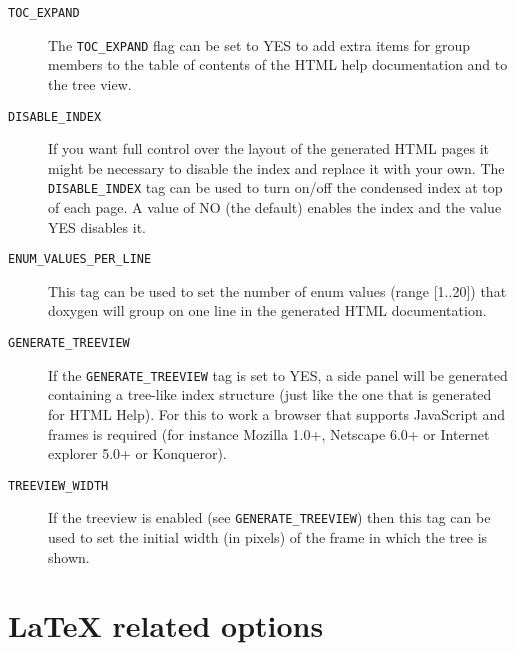 \begin{description}
\label{config_cfg_toc_expand}
\hypertarget{config_cfg_toc_expand}{}
 \item[{\tt TOC\_\-EXPAND} ] The {\tt TOC\_\-EXPAND} flag can be set to YES to add extra items for group members to the table of contents of the HTML help documentation and to the tree view.

\label{config_cfg_disable_index}
\hypertarget{config_cfg_disable_index}{}
 \item[{\tt DISABLE\_\-INDEX} ] If you want full control over the layout of the generated HTML pages it might be necessary to disable the index and replace it with your own. The {\tt DISABLE\_\-INDEX} tag can be used to turn on/off the condensed index at top of each page. A value of NO (the default) enables the index and the value YES disables it.

\label{config_cfg_enum_values_per_line}
\hypertarget{config_cfg_enum_values_per_line}{}
 \item[{\tt ENUM\_\-VALUES\_\-PER\_\-LINE} ] This tag can be used to set the number of enum values (range \mbox{[}1..20\mbox{]}) that doxygen will group on one line in the generated HTML documentation.

\label{config_cfg_generate_treeview}
\hypertarget{config_cfg_generate_treeview}{}
 \item[{\tt GENERATE\_\-TREEVIEW} ] If the {\tt GENERATE\_\-TREEVIEW} tag is set to YES, a side panel will be generated containing a tree-like index structure (just like the one that is generated for HTML Help). For this to work a browser that supports JavaScript and frames is required (for instance Mozilla 1.0+, Netscape 6.0+ or Internet explorer 5.0+ or Konqueror).

\label{config_cfg_treeview_width}
\hypertarget{config_cfg_treeview_width}{}
 \item[{\tt TREEVIEW\_\-WIDTH} ] If the treeview is enabled (see {\tt GENERATE\_\-TREEVIEW}) then this tag can be used to set the initial width (in pixels) of the frame in which the tree is shown.

\end{description}
\hypertarget{config_latex_output}{}\section{LaTeX related options}\label{config_latex_output}
